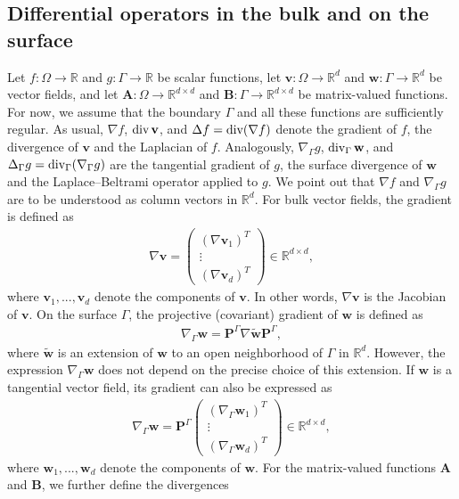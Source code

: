 \documentclass[10pt,reqno]{amsart}
\theoremstyle{remark}
\numberwithin{equation}{section}
\newcommand{\R}{\mathbb R}
\newcommand{\bv}{\mathbf{v}}
\newcommand{\bw}{\mathbf{w}}
\newcommand{\tw}{\widetilde{\bw}}
\newcommand{\Grad}{\nabla}
\newcommand{\Lap}{\Delta}
\newcommand{\Div}{\textnormal{div}}
\newcommand{\Gradg}{\nabla_\Ga}
\newcommand{\Lapg}{\Delta_\Ga}
\newcommand{\Divg}{\textnormal{div}_\Ga}
\newcommand{\Ga}{\Gamma}
\begin{document}
\subsection{Differential operators in the bulk and on the surface} \label{NOT:DIFFOP}
Let $f:\Omega\to\R$ and $g:\Gamma\to\R$ be scalar functions, let $\bv:\Omega\to \R^d$ and $\bw:\Gamma\to\R^d$ be vector fields, and let $\mathbf{A}:\Omega\to\R^{d\times d}$ and $\mathbf{B}:\Gamma\to\R^{d\times d}$ be matrix-valued functions. 
For now, we assume that the boundary $\Gamma$ and all these functions are sufficiently regular.
As usual, $\Grad f$, $\Div\,\bv$, and $\Lap f = \Div(\Grad f)$ denote the gradient of $f$, the divergence of $\bv$ and the Laplacian of $f$. 
Analogously, $\Gradg g$, $\Divg\,\bw$, and $\Lapg g = \Divg(\Gradg g)$ are the tangential gradient of $g$, the surface divergence of $\bw$ and the Laplace--Beltrami operator applied to $g$. 
We point out that $\Grad f$ and $\Gradg g$ are to be understood as column vectors in $\R^d$.
For bulk vector fields, the gradient is defined as
\begin{align*}
    \Grad \bv = 
    \begin{pmatrix}
        (\Grad \bv_1)^T \\ \vdots \\ (\Grad \bv_d)^T
    \end{pmatrix}
    \in \R^{d\times d},
\end{align*}
where $\bv_1,...,\bv_d$ denote the components of $\bv$. In other words, $\Grad\bv$ is the Jacobian of $\bv$. On the surface $\Gamma$, the projective (covariant) gradient of $\bw$ is defined as 
\begin{align*}
    \Gradg\bw = \mathbf{P}^\Gamma \Grad\tw \mathbf{P}^\Gamma,
\end{align*}
where $\tw$ is an extension of $\bw$ to an open neighborhood of $\Gamma$ in $\R^d$. However, the expression $\Gradg\bw$ does not depend on the precise choice of this extension. If $\bw$ is a tangential vector field, its gradient can also be expressed as
\begin{align*}
    \Gradg \bw = \mathbf{P}^\Gamma
    \begin{pmatrix}
        (\Gradg \bw_1)^T \\ \vdots \\ (\Gradg \bw_d)^T
    \end{pmatrix}
    \in \R^{d\times d},
\end{align*}
where $\bw_1,...,\bw_d$ denote the components of $\bw$.  
For the matrix-valued functions $\mathbf{A}$ and $\mathbf{B}$, we further define the divergences
\end{document}
